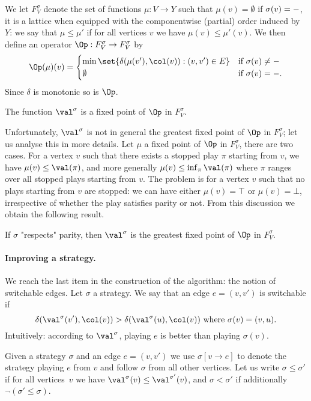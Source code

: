 We let $F^\sigma_V$ denote the set of functions $\mu : V \to Y$ such that $\mu(v) = \emptyset$ if $\sigma(v) = \mathtt{-}$,
it is a lattice when equipped with the componentwise (partial) order induced by $Y$:
we say that $\mu \le \mu'$ if for all vertices $v$ we have $\mu(v) \le \mu'(v)$.
We then define an operator $\Op : F^\sigma_V \to F^\sigma_V$ by
\[
\Op(\mu)(v) = 
\begin{cases}
\min \set{\delta( \mu(v'), \col(v)) : (v,v') \in E} & \text{if } \sigma(v) \neq \siblank \\
\emptyset 											& \text{if } \sigma(v) = \siblank.
\end{cases}
\]
Since $\delta$ is monotonic so is $\Op$.

\begin{fact}
The function $\val^\sigma$ is a fixed point of $\Op$ in $F^\sigma_V$.
\end{fact}
Unfortunately, $\val^{\sigma}$ is not in general the greatest fixed point of $\Op$ in $F^\sigma_V$;
let us analyse this in more details.
Let $\mu$ a fixed point of $\Op$ in $F^\sigma_V$, there are two cases. 
For a vertex $v$ such that there exists a stopped play $\pi$ starting from $v$, we have $\mu(v) \le \val(\pi)$, and more generally
$\mu(v) \le \inf_{\pi} \val(\pi)$ where $\pi$ ranges over all stopped plays starting from $v$.
The problem is for a vertex $v$ such that no plays starting from $v$ are stopped: 
we can have either $\mu(v) = \top$ or $\mu(v) = \bot$, irrespective of whether the play satisfies parity or not.
From this discussion we obtain the following result.

\begin{lemma}
\label{3-lem:greatest_fixed_point}
If $\sigma$ "respects" parity, then $\val^{\sigma}$ is the greatest fixed point of $\Op$ in $F^\sigma_V$.
\end{lemma}

\paragraph{\bf Improving a strategy.}
We reach the last item in the construction of the algorithm: the notion of switchable edges.
Let $\sigma$ a strategy. We say that an edge $e = (v,v')$ is switchable if 
\[
\delta(\val^{\sigma}(v'),\col(v)) > \delta(\val^{\sigma}(u),\col(v)) \text{ where } \sigma(v) = (v,u).
\]
Intuitively: according to $\val^{\sigma}$, playing $e$ is better than playing $\sigma(v)$.

Given a strategy $\sigma$ and an edge $e = (v,v')$ we use $\sigma[v \to e]$ to denote the strategy playing $e$ from $v$ 
and follow $\sigma$ from all other vertices.
Let us write $\sigma \le \sigma'$ if for all vertices~$v$ we have $\val^{\sigma}(v) \le \val^{\sigma'}(v)$,
and $\sigma < \sigma'$ if additionally $\neg (\sigma' \le \sigma)$.

